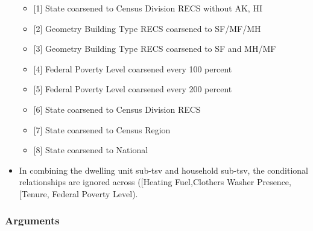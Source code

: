 \begin{itemize}
\begin{itemize}
  \item
    {[}1{]} State coarsened to Census Division RECS without AK, HI
  \item
    {[}2{]} Geometry Building Type RECS coarsened to SF/MF/MH
  \item
    {[}3{]} Geometry Building Type RECS coarsened to SF and MH/MF
  \item
    {[}4{]} Federal Poverty Level coarsened every 100 percent
  \item
    {[}5{]} Federal Poverty Level coarsened every 200 percent
  \item
    {[}6{]} State coarsened to Census Division RECS
  \item
    {[}7{]} State coarsened to Census Region
  \item
    {[}8{]} State coarsened to National
  \end{itemize}
\item
  In combining the dwelling unit sub-tsv and household sub-tsv, the
  conditional relationships are ignored across
  ({[}\textquotesingle Heating
  Fuel\textquotesingle,\textquotesingle Clothers Washer
  Presence\textquotesingle{]},
  {[}\textquotesingle Tenure\textquotesingle, \textquotesingle Federal
  Poverty Level\textquotesingle{]}).
\end{itemize}

\subsubsection{Arguments}\label{arguments-6}


